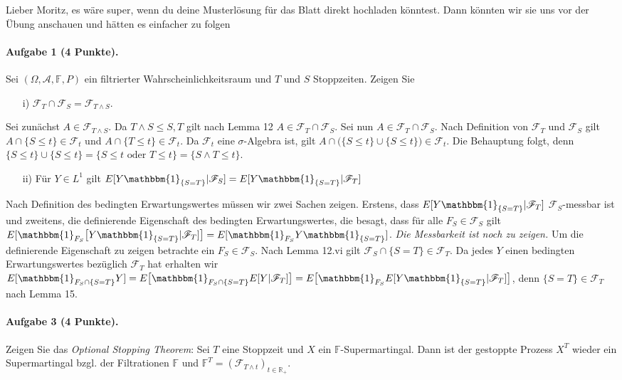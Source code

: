 \documentclass{article}
\begin{document}
Lieber Moritz, es wäre super, wenn du deine Musterlösung für das Blatt direkt hochladen könntest.
Dann könnten wir sie uns vor der Übung anschauen und hätten es einfacher zu folgen \smiley
\paragraph{Aufgabe 1 \textnormal{(4 Punkte)}.}
Sei $(\Omega,\mathscr{A},\mathbb{F},P)$ ein filtrierter Wahrscheinlichkeitsraum und $T$ und $S$ Stoppzeiten.
Zeigen Sie
\begin{itemize}
\item [i)] $\mathscr{F}_T\cap\mathscr{F}_S=\mathscr{F}_{T\wedge S}$.
\end{itemize}
Sei zunächst $A\in\mathscr{F}_{T\wedge S}$.
Da $T\wedge S\leq S,T$ gilt nach Lemma 12 $A\in\mathscr{F}_T\cap\mathscr{F}_S$.
Sei nun $A\in\mathscr{F}_T\cap\mathscr{F}_S$.
Nach Definition von $\mathscr{F}_T$ und $\mathscr{F}_S$ gilt $A\cap\{S\leq t\}\in\mathscr{F}_t$ und $A\cap\{T\leq t\}\in\mathscr{F}_t$.
Da $\mathscr{F}_t$ eine $\sigma$-Algebra ist, gilt $A\cap\bigl(\{S\leq t\}\cup \{S\leq t\}\bigr)\in\mathscr{F}_t$.
Die Behauptung folgt, denn $\{S\leq t\}\cup \{S\leq t\}=\bigl\{S\leq t\text{ oder }T\leq t\bigr\}=\{S\wedge T\leq t\}$.
\begin{itemize}
\item [ii)] Für $Y\in L^1$ gilt $E[Y\mathbbm{1}_{\{S=T\}}|\mathscr{F}_S]=E[Y\mathbbm{1}_{\{S=T\}}|\mathscr{F}_T]$
\end{itemize}
Nach Definition des bedingten Erwartungswertes müssen wir zwei Sachen zeigen. Erstens, dass $E[Y\mathbbm{1}_{\{S=T\}}|\mathscr{F}_T]$ $\mathscr{F}_S$-messbar ist und zweitens, die definierende Eigenschaft des bedingten Erwartungswertes, die besagt, dass für alle $F_S\in\mathscr{F}_S$ gilt $E[\mathbbm{1}_{F_S}\bigl[Y\mathbbm{1}_{\{S=T\}}|\mathscr{F}_T]\bigr]=E[\mathbbm{1}_{F_S}Y\mathbbm{1}_{\{S=T\}}]$.
\emph{Die Messbarkeit ist noch zu zeigen.}
Um die definierende Eigenschaft zu zeigen betrachte ein $F_S\in\mathscr{F}_S$.
Nach Lemma 12.vi gilt $\mathscr{F}_S\cap\{S=T\}\in\mathscr{F}_T$.
Da jedes $Y$ einen bedingten Erwartungswertes bezüglich $\mathscr{F}_T$ hat erhalten wir $E[\mathbbm{1}_{F_S\cap\{S=T\}}Y]=E\bigl[\mathbbm{1}_{F_S\cap\{S=T\}}E[Y|\mathscr{F}_T]\bigr]=E\bigl[\mathbbm{1}_{F_S}E[Y\mathbbm{1}_{\{S=T\}}|\mathscr{F}_T]\bigr]$, denn $\{S=T\}\in\mathscr{F}_T$ nach Lemma 15.

\paragraph{Aufgabe 3 \textnormal{(4 Punkte)}.} Zeigen Sie das \emph{Optional Stopping Theorem}: Sei $T$ eine Stoppzeit und $X$ ein $\mathbb{F}$-Supermartingal.
Dann ist der gestoppte Prozess $X^T$ wieder ein Supermartingal bzgl. der Filtrationen $\mathbb{F}$ und $\mathbb{F}^T=(\mathscr{F}_{T\wedge t})_{t\in\mathbb{R}_+}$.
\end{document}
